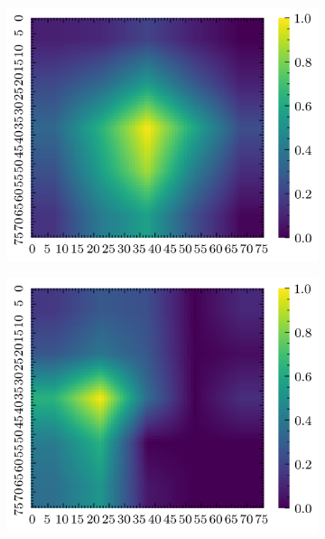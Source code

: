 \documentclass[../document.tex]{subfiles}
\begin{document}
\begin{figure}[H]
\begin{subfigure}[b]{0.19\textwidth}
        \includegraphics[width=\linewidth]{../img/5/quarry/best/grad-cam-2d-2.png}
    \end{subfigure}
    \begin{subfigure}[b]{0.19\textwidth}
        \includegraphics[width=\linewidth]{../img/5/quarry/best/grad-cam-2d-3.png}
    \end{subfigure}  
    \begin{subfigure}[b]{0.19\textwidth}

\end{subfigure}
\end{figure}
\end{document}
